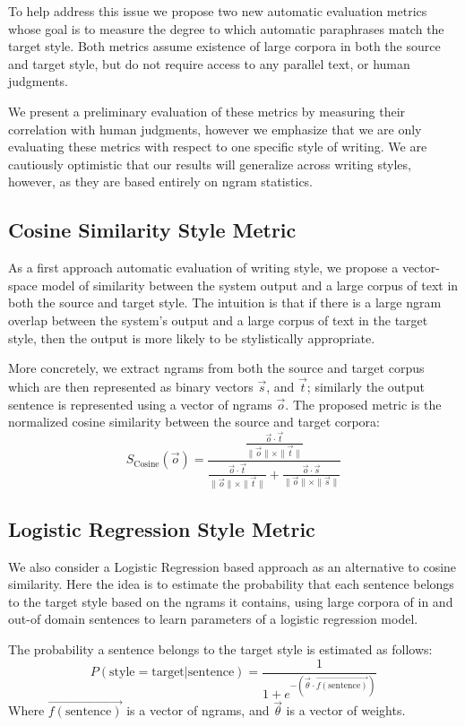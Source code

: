 \documentclass[10pt,a5paper,twoside]{article}
\begin{document}
To help address this issue we propose two new automatic evaluation metrics whose goal is to measure the degree to which
automatic paraphrases match the target style.  Both metrics assume existence of large corpora in both the source and
target style, but do not require access to any parallel text, or human judgments.

We present a preliminary evaluation of these metrics by measuring their correlation with human judgments, however
we emphasize that we are only evaluating these metrics with respect to one specific style of writing.  We
are cautiously optimistic that our results will generalize across writing styles, however, as they are based entirely
on ngram statistics.

\subsection{Cosine Similarity Style Metric}
As a first approach automatic evaluation of writing style, we propose a vector-space model of similarity between the system
output and a large corpus of text in both the source and target style.  The intuition is that if there is a large ngram
overlap between the system's output and a large corpus of text in the target style, then the output is more likely to be
stylistically appropriate.

More concretely, we extract ngrams from both the source and target corpus which are then represented as binary
vectors $\vec{s}$, and $\vec{t}$; similarly the output sentence is represented using a vector of
ngrams $\vec{o}$.  
The proposed metric is the normalized cosine similarity between the source and target corpora:
\[
S_{\text{Cosine}}(\vec{o}) = \frac{\frac{\vec{o} \cdot \vec{t}}{\|\vec{o}\| \times \|\vec{t}\|}}{\frac{\vec{o} \cdot \vec{t}}{\|\vec{o}\| \times \|\vec{t}\|} + \frac{\vec{o} \cdot \vec{s}}{\|\vec{o}\| \times \|\vec{s}\|}}
\]
 

\subsection{Logistic Regression Style Metric}
We also consider a Logistic Regression based approach as an alternative to cosine similarity.  Here the idea is to estimate the probability that each
sentence belongs to the target style based on the ngrams it contains, using large corpora of in and out-of domain sentences to learn  parameters of a logistic regression model.

The probability a sentence belongs to the target style is estimated as follows:
\[
P(\text{style} = \text{target}|\text{sentence}) = \frac{1}{1 + e^{-\left( \vec{\theta} \cdot \vec{f(\text{sentence})} \right)}}
\]
Where $\vec{f(\text{sentence})}$ is a vector of ngrams, and $\vec{\theta}$ is a vector of weights.  
\end{document}
